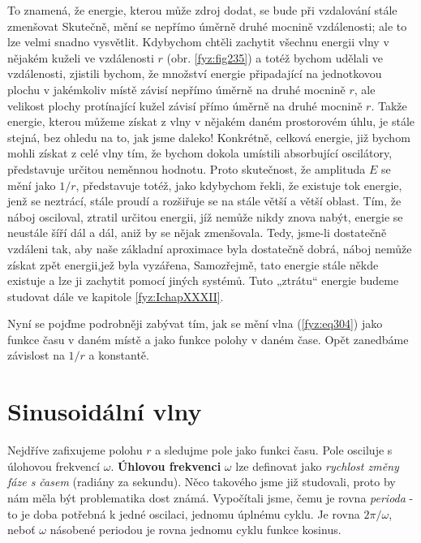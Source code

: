     To znamená, že energie, kterou může zdroj dodat, se bude při vzdalování stále zmenšovat 
    Skutečně, mění se nepřímo úměrně druhé mocnině vzdálenosti; ale to lze velmi snadno vysvětlit. 
    Kdybychom chtěli zachytit všechnu energii vlny v nějakém kuželi ve vzdálenosti \(r\) (obr. 
    \ref{fyz:fig235}) a totéž bychom udělali ve vzdálenosti, zjistili bychom, že množství energie 
    připadající na jednotkovou plochu v jakémkoliv místě závisí nepřímo úměrně na druhé mocnině 
    \(r\), ale velikost plochy protínající kužel závisí přímo úměrně na druhé mocnině \(r\). Takže 
    energie, kterou můžeme získat z vlny v nějakém daném prostorovém úhlu, je stále stejná, bez 
    ohledu na to, jak jsme daleko! Konkrétně, celková energie, již bychom mohli získat z celé vlny 
    tím, že bychom dokola umístili absorbující oscilátory, představuje určitou neměnnou hodnotu. 
    Proto skutečnost, že amplituda \(E\) se mění jako \(1/r\), představuje totéž, jako kdybychom 
    řekli, že existuje tok energie, jenž se neztrácí, stále proudí a rozšiřuje se na stále větší a 
    větší oblast. Tím, že náboj osciloval, ztratil určitou energii, jíž nemůže nikdy znova nabýt, 
    energie se neustále šíří dál a dál, aniž by se nějak zmenšovala. Tedy, jsme-li dostatečně 
    vzdáleni tak, aby naše základní aproximace byla dostatečně dobrá, náboj nemůže získat zpět 
    energii,jež byla vyzářena, Samozřejmě, tato energie stále někde existuje a lze ji zachytit 
    pomocí jiných systémů. Tuto „ztrátu“ energie budeme studovat dále ve kapitole 
    \ref{fyz:IchapXXXII}.
    
    Nyní se pojďme podrobněji zabývat tím, jak se mění vlna (\ref{fyz:eq304}) jako funkce času v 
    daném místě a jako funkce polohy v daném čase. Opět zanedbáme závislost na \(1/r\) a konstantě.
    
  \section{Sinusoidální vlny}\label{fyz:IchapXXIXsecIII}
    Nejdříve zafixujeme polohu \(r\) a sledujme pole jako funkci času. Pole osciluje s úlohovou 
    frekvencí \(\omega\). \textbf{Úhlovou frekvenci} \(\omega\) lze definovat jako \emph{rychlost 
    změny fáze s časem} (radiány za sekundu). Něco takového jsme již studovali, proto by nám měla 
    být problematika dost známá. Vypočítali jsme, čemu je rovna \emph{perioda} - to je doba 
    potřebná k jedné oscilaci, jednomu úplnému cyklu. Je rovna \(2\pi/\omega\), neboť \(\omega\) 
    násobené periodou je rovna jednomu cyklu funkce kosinus.
    
